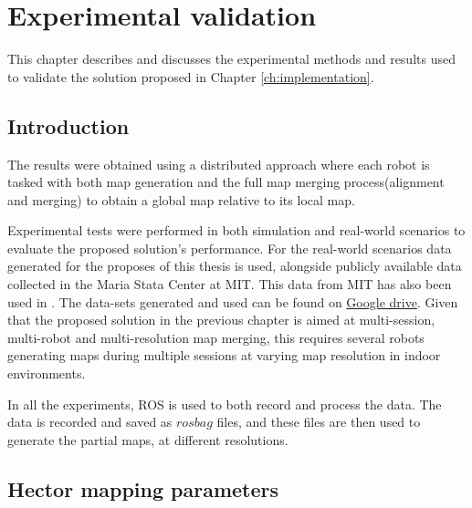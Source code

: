 
\chapter{Experimental validation}
\label{ch:experimental}

This chapter describes and discusses the experimental methods and results used to validate the solution proposed in Chapter \ref{ch:implementation}. 

\section{Introduction}
\label{sec:ch4.section1}
The results were obtained using a distributed approach where each robot is tasked with both map generation and the full map merging process(alignment and merging) to obtain a global map relative to its local map.

Experimental tests were performed in both simulation and real-world scenarios to evaluate the proposed solution's performance. For the real-world scenarios data generated for the proposes of this thesis is used, alongside publicly available data collected in the Maria Stata Center at MIT. This data from MIT has also been used in \cite{8250173, 7849536, doi:10.1177/0278364915614638}. The data-sets generated and used can be found on \href{https://drive.google.com/drive/folders/1c\_2-T8FcrSmE0VDyHw20-jRLHKRuAvpE}{Google drive}. Given that the proposed solution in the previous chapter is aimed at multi-session, multi-robot and multi-resolution map merging, this requires several robots generating maps during multiple sessions at varying map resolution in indoor environments.

In all the experiments, ROS is used to both record and process the data. The data is recorded and saved as \(rosbag\) files, and these files are then used to generate the partial maps, at different resolutions.

\section{Hector mapping parameters}

